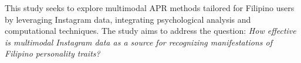 

This study seeks to explore multimodal APR methods tailored for Filipino users by leveraging Instagram data, integrating psychological analysis and computational techniques. The study aims to address the question: \textit{How effective is multimodal Instagram data as a source for recognizing manifestations of Filipino personality traits?}








